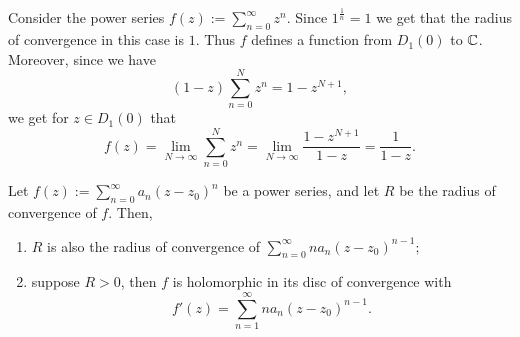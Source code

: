 \documentclass[11pt,a4paper]{article}
\begin{document}
\begin{example}
  Consider the power series $f(z) := \sum_{n=0}^{\infty} z^n$.
  Since $1^{\frac 1n} = 1$ we get that the radius of convergence in
  this case is $1$.
  Thus $f$ defines a function from $D_1(0)$ to $\mathbb{C}$.
  Moreover, since we have
  \[
    (1 - z) \sum_{n=0}^{N} z^n = 1 - z^{N + 1},
  \]
  we get for $z \in D_1(0)$ that
  \[
    f(z) =
    \lim_{N \to \infty} \sum_{n=0}^{N} z^n =
    \lim_{N \to \infty} \frac{1 - z^{N + 1}}{1 - z} =
    \frac{1}{1 - z}.
  \]
\end{example}

\begin{proposition}
  \label{prop:holo-on-disc}
  Let $f(z) := \sum_{n=0}^{\infty} a_n (z - z_0)^n$ be a power series,
  and let $R$ be the radius of convergence of $f$. Then,
  \begin{enumerate}
    \item[(1)] $R$ is also the radius of convergence of
      $\sum_{n=0}^{\infty} n a_n (z - z_0)^{n - 1}$;
    \item[(2)] suppose $R > 0$, then $f$ is holomorphic in its disc of
      convergence with
      \[
        f'(z) = \sum_{n=1}^{\infty} n a_n (z - z_0)^{n - 1}.
      \]
  \end{enumerate}
\end{proposition}
\end{document}

